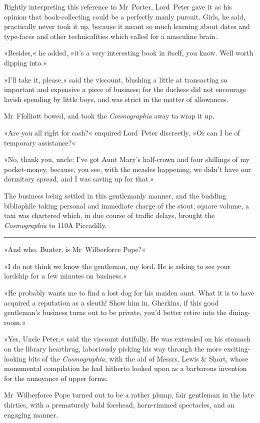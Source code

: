 Rightly interpreting this reference to Mr~Porter, Lord~Peter gave it as his opinion that book-collecting could be a perfectly manly pursuit. Girls, he said, practically never took it up, because it meant so much learning about dates and type-faces and other technicalities which called for a masculine brain.

»Besides,« he added, »it's a very interesting book in itself, you know. Well worth dipping into.«

»I'll take it, please,« said the viscount, blushing a little at transacting so important and expensive a piece of business; for the duchess did not encourage lavish spending by little boys, and was strict in the matter of allowances.

Mr~Ffolliott bowed, and took the \textit{Cosmographia} away to wrap it up.

»Are you all right for cash?« enquired Lord~Peter discreetly. »Or can I be of temporary assistance?«

»No, thank you, uncle; I've got Aunt Mary's half-crown and four shillings of my pocket-money, because, you see, with the measles happening, we didn't have our dormitory spread, and I was saving up for that.«

The business being settled in this gentlemanly manner, and the budding bibliophile taking personal and immediate charge of the stout, square volume, a taxi was chartered which, in due course of traffic delays, brought the \textit{Cosmographia} to 110A Piccadilly.

\noindent\hfil\rule{0.5\textwidth}{.4pt}\hfil 
\pagebreak[2]

»And who, Bunter, is Mr~Wilberforce Pope?«

»I do not think we know the gentleman, my lord. He is asking to see your lordship for a few minutes on business.«

»He probably wants me to find a lost dog for his maiden aunt. What it is to have acquired a reputation as a sleuth! Show him in. Gherkins, if this good gentleman's business turns out to be private, you'd better retire into the dining-room.«

»Yes, Uncle Peter,« said the viscount dutifully. He was extended on his stomach on the library hearthrug, laboriously picking his way through the more exciting-looking bits of the \textit{Cosmographia}, with the aid of Messrs. Lewis \& Short, whose monumental compilation he had hitherto looked upon as a barbarous invention for the annoyance of upper forms.

Mr~Wilberforce Pope turned out to be a rather plump, fair gentleman in the late thirties, with a prematurely bald forehead, horn-rimmed spectacles, and an engaging manner.

